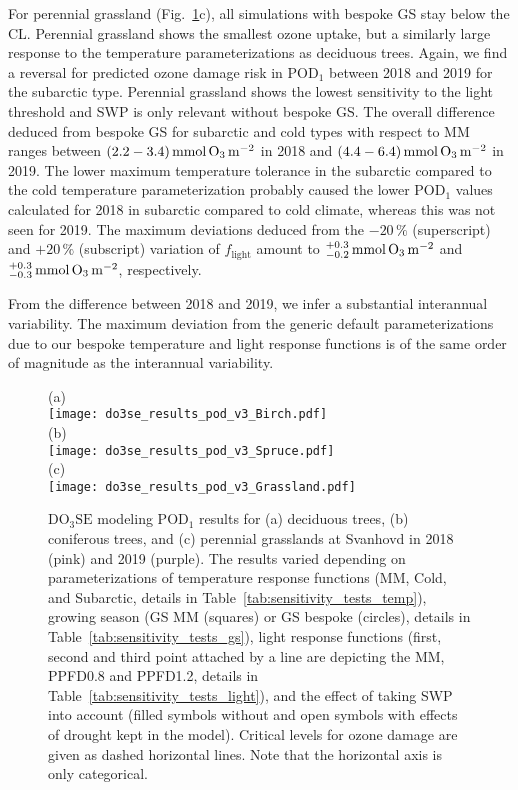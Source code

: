 \documentclass[bg, manuscript]{copernicus}
\begin{document}
For perennial grassland (Fig.~\ref{fig:pody_rel}c), all simulations with bespoke GS stay below the CL. Perennial grassland shows the smallest ozone uptake, but a similarly large response to the temperature parameterizations as deciduous trees. Again, we find a reversal for predicted ozone damage risk in $\mathrm{POD_1}$ between 2018 and 2019 for the subarctic type. Perennial grassland shows the lowest sensitivity to the light threshold and SWP is only relevant without bespoke GS. The overall difference deduced from bespoke GS for subarctic and cold types with respect to MM ranges between $(2.2-3.4)\,\unit{mmol\,\chem{O_3}\,m^{-2}}$ in 2018 and $(4.4-6.4)\,\unit{mmol\,\chem{O_3}\,m^{-2}}$ in 2019. The lower maximum temperature tolerance in the subarctic compared to the cold temperature parameterization probably caused the lower $\mathrm{POD_1}$ values calculated for 2018 in subarctic compared to cold climate, whereas this was not seen for 2019. The maximum deviations deduced from the $-20\,\unit{\%}$ (superscript) and $+20\,\unit{\%}$ (subscript) variation of $f_\mathrm{light}$ amount to $^{+0.3}_{-0.2}\,\unit{mmol\,\chem{O_3}\,m^{-2}}$ and $^{+0.3}_{-0.3}\,\unit{mmol\,\chem{O_3}\,m^{-2}}$, respectively.

From the difference between 2018 and 2019, we infer a substantial interannual variability. The maximum deviation from the generic default parameterizations due to our bespoke temperature and light response functions is of the same order of magnitude as the interannual variability.

\begin{figure}[t]
  \centering
  (a)\\
  \texttt{[image: do3se\_results\_pod\_v3\_Birch.pdf]}\\
  (b)\\
  \texttt{[image: do3se\_results\_pod\_v3\_Spruce.pdf]}\\
  (c)\\
  \texttt{[image: do3se\_results\_pod\_v3\_Grassland.pdf]}
  \caption{$\mathrm{DO_3SE}$ modeling $\mathrm{POD_1}$ results for (a) deciduous trees, (b) coniferous trees, and (c) perennial grasslands at Svanhovd in 2018 (pink) and 2019 (purple). The results varied depending on parameterizations of temperature response functions (MM, Cold, and Subarctic, details in Table~\ref{tab:sensitivity_tests_temp}), growing season (GS MM (squares) or GS bespoke (circles), details in Table~\ref{tab:sensitivity_tests_gs}), light response functions (first, second and third point attached by a line are depicting the MM, PPFD0.8 and PPFD1.2, details in Table~\ref{tab:sensitivity_tests_light}), and the effect of taking SWP into account (filled symbols without and open symbols with effects of drought kept in the model). Critical levels for ozone damage \citep{ICP:MappingManual2017,ESPR:Hayes2021} are given as dashed horizontal lines. Note that the horizontal axis is only categorical.}
  \label{fig:pody_rel}
\end{figure}
\end{document}
